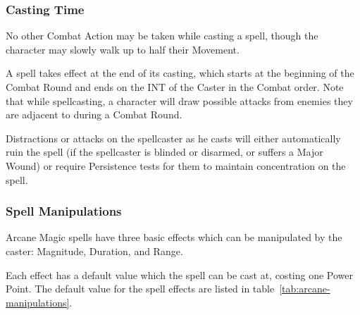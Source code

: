 \subsubsection{Casting Time}
No other Combat Action may be taken while casting a spell, though the character may slowly walk up to half their Movement. 

A spell takes effect at the end of its casting, which starts at the beginning of the Combat Round and ends on the INT of the Caster in the Combat order. Note that while spellcasting, a character will draw possible attacks from enemies they are adjacent to during a Combat Round. 

Distractions or attacks on the spellcaster as he casts will either automatically ruin the spell (if the spellcaster is blinded or disarmed, or suffers a Major Wound) or require Persistence tests for them to maintain concentration on the spell. 

\subsubsection{Spell Manipulations}
Arcane Magic spells have three basic effects which can be manipulated by the caster: Magnitude, Duration, and Range.

Each effect has a default value which the spell can be cast at, costing one Power Point. The default value for the spell effects are listed in table~\ref{tab:arcane-manipulations}.

